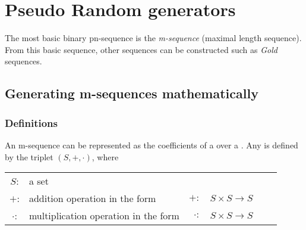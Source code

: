 
\chapter{Pseudo Random generators}




 
The most basic binary pn-sequence is the {\em m-sequence}
(maximal length sequence).
From this basic sequence, other sequences can be constructed
such as {\em Gold} sequences.

\section{Generating m-sequences mathematically}
\label{sec:math}
\subsection{Definitions}
\label{sec:def}
An m-sequence can be represented as the coefficients of a 
over a .
Any  is defined by the triplet $(S,+,\cdot)$,
where

\begin{tabular}{clrlll}
   $S$:     & a set \\
   $+$:     & addition   operation in the form       &$+:$     &$S\times S\to S$ \\
   $\cdot$: & multiplication   operation in the form &$\cdot:$ &$S\times S\to S $
\end{tabular}


